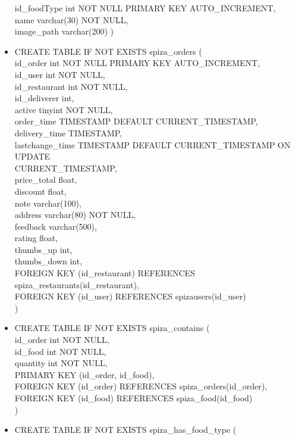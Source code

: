 \documentclass[12pt]{scrartcl}
\begin{document}
\begin{itemize}
    id\_foodType int NOT NULL PRIMARY KEY AUTO\_INCREMENT,\\
    name varchar(30) NOT NULL,\\
    image\_path varchar(200)
    )
    \item[] CREATE TABLE IF NOT EXISTS spiza\_orders  (\\
    id\_order int NOT NULL PRIMARY KEY AUTO\_INCREMENT,\\
    id\_user int NOT NULL,\\
    id\_restaurant int NOT NULL,\\
    id\_deliverer int,\\
    active tinyint NOT NULL,\\
    order\_time TIMESTAMP DEFAULT CURRENT\_TIMESTAMP,\\
    delivery\_time TIMESTAMP,\\
    lastchange\_time TIMESTAMP DEFAULT CURRENT\_TIMESTAMP ON UPDATE\\ CURRENT\_TIMESTAMP,\\
    price\_total float,\\ 
    discount float,\\
    note varchar(100),\\
    address varchar(80) NOT NULL,\\
    feedback varchar(500),\\
    rating float,\\
    thumbs\_up int,\\
    thumbs\_down int, \\
    FOREIGN KEY (id\_restaurant) REFERENCES spiza\_restaurants(id\_restaurant),\\
    FOREIGN KEY (id\_user) REFERENCES spiza\textunderscore users(id\_user)\\
    )
    \item[] CREATE TABLE IF NOT EXISTS spiza\_contains (\\
    id\_order int NOT NULL,\\
    id\_food int NOT NULL,\\
    quantity int NOT NULL,\\
    PRIMARY KEY (id\_order, id\_food),\\
    FOREIGN KEY (id\_order) REFERENCES spiza\_orders(id\_order),\\
    FOREIGN KEY (id\_food) REFERENCES spiza\_food(id\_food)\\
    )
    \item[] CREATE TABLE IF NOT EXISTS spiza\_has\_food\_type (\\

\end{itemize}
\end{document}

